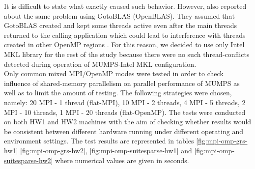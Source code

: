 It is difficult to state what exactly caused such behavior. However, \citeauthor{chowdhury2010some} also reported about the same problem using GotoBLAS (OpenBLAS). They assumed that GotoBLAS created and kept some threads active even after the main threads returned to the calling application which could lead to interference with threads created in other OpenMP regions \cite{chowdhury2010some}. For this reason, we decided to use only Intel MKL library for the rest of the study because there were no such thread-conflicts detected during operation of MUMPS-Intel MKL configuration.\\


Only common mixed MPI/OpenMP modes were tested in order to check influence of shared-memory parallelism on parallel performance of MUMPS as well as to limit the amount of testing. The following strategies were chosen, namely: 20 MPI - 1 thread (flat-MPI), 10 MPI - 2 threads, 4 MPI - 5 threads, 2 MPI - 10 threads, 1 MPI - 20 threads (flat-OpenMP). The tests were conducted on both HW1 and HW2 machines with the aim of checking whether  results would be consistent between different hardware running under different operating and environment settings. The test results are represented in tables \ref{fig:mpi-omp-grs-hw1} \ref{fig:mpi-omp-grs-hw2}, \ref{fig:mpi-omp-suitesparse-hw1} and \ref{fig:mpi-omp-suitesparse-hw2} where numerical values are given in seconds.\\


